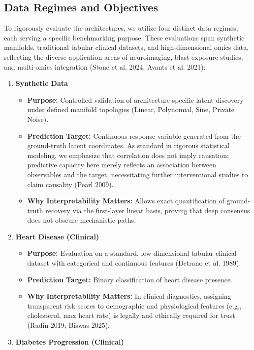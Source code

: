\documentclass[
  letterpaper,
]{report}
\providecommand{\tightlist}{%
  \setlength{\itemsep}{0pt}\setlength{\parskip}{0pt}}
\begin{document}
\subsection{Data Regimes and
Objectives}\label{data-regimes-and-objectives}

To rigorously evaluate the architectures, we utilize four distinct data
regimes, each serving a specific benchmarking purpose. These evaluations
span synthetic manifolds, traditional tabular clinical datasets, and
high-dimensional omics data, reflecting the diverse application areas of
neuroimaging, blast-exposure studies, and multi-omics integration
({Stone et al.} 2024; Avants et al. 2021):

\begin{enumerate}
\def\labelenumi{\arabic{enumi}.}
\tightlist
\item
  \textbf{Synthetic Data}

  \begin{itemize}
  \tightlist
  \item
    \textbf{Purpose:} Controlled validation of architecture-specific
    latent discovery under defined manifold topologies (Linear,
    Polynomial, Sine, Private Noise).
  \item
    \textbf{Prediction Target:} Continuous response variable generated
    from the ground-truth latent coordinates. As standard in rigorous
    statistical modeling, we emphasize that correlation does not imply
    causation; predictive capacity here merely reflects an association
    between observables and the target, necessitating further
    interventional studies to claim causality (Pearl 2009).
  \item
    \textbf{Why Interpretability Matters:} Allows exact quantification
    of ground-truth recovery via the first-layer linear basis, proving
    that deep consensus does not obscure mechanistic paths.
  \end{itemize}
\item
  \textbf{Heart Disease (Clinical)}

  \begin{itemize}
  \tightlist
  \item
    \textbf{Purpose:} Evaluation on a standard, low-dimensional tabular
    clinical dataset with categorical and continuous features (Detrano
    et al. 1989).
  \item
    \textbf{Prediction Target:} Binary classification of heart disease
    presence.
  \item
    \textbf{Why Interpretability Matters:} In clinical diagnostics,
    assigning transparent risk scores to demographic and physiological
    features (e.g., cholesterol, max heart rate) is legally and
    ethically required for trust (Rudin 2019; Biswas 2025).
  \end{itemize}
\item
  \textbf{Diabetes Progression (Clinical)}


\end{enumerate}
\end{document}
